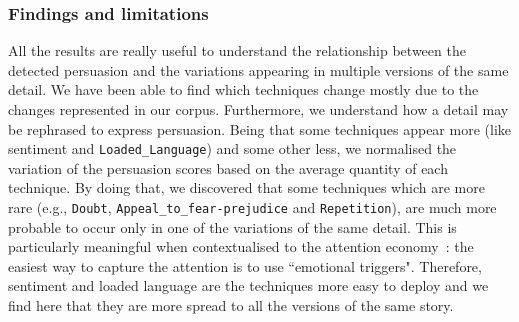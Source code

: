 


\subsubsection{Findings and limitations}

All the results are really useful to understand the relationship between the detected persuasion and the variations appearing in multiple versions of the same detail.
We have been able to find which techniques change mostly due to the changes represented in our corpus. Furthermore, we understand how a detail may be rephrased to express persuasion.
Being that some techniques appear more (like 
 sentiment and \texttt{Loaded\_Language}) and some other less, we normalised the variation of the persuasion scores based on the average quantity of each technique.
 By doing that, we discovered that some techniques which are more rare (e.g., \texttt{Doubt}, \texttt{Appeal\_to\_fear-prejudice} and \texttt{Repetition}), are much more probable to occur only in one of the variations of the same detail.
This is particularly meaningful when contextualised to the attention economy~\citep{davenport2001attention}:
the easiest way to capture the attention is to use ``emotional triggers".
Therefore, sentiment and loaded language are the techniques more easy to deploy and we find here that they are more spread to all the versions of the same story.

